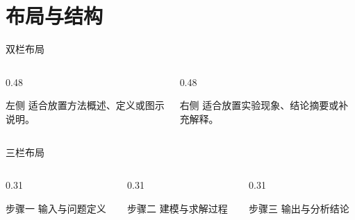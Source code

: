 \section{布局与结构}

\begin{frame}{双栏布局}
  \begin{columns}[T]
    \begin{column}{0.48\textwidth}
      \begin{block}{左侧}
        适合放置方法概述、定义或图示说明。
      \end{block}
    \end{column}
    \begin{column}{0.48\textwidth}
      \begin{block}{右侧}
        适合放置实验现象、结论摘要或补充解释。
      \end{block}
    \end{column}
  \end{columns}
\end{frame}

\begin{frame}{三栏布局}
  \begin{columns}[T]
    \begin{column}{0.31\textwidth}
      \begin{exampleblock}{步骤一}
        输入与问题定义
      \end{exampleblock}
    \end{column}
    \begin{column}{0.31\textwidth}
      \begin{exampleblock}{步骤二}
        建模与求解过程
      \end{exampleblock}
    \end{column}
    \begin{column}{0.31\textwidth}
      \begin{exampleblock}{步骤三}
        输出与分析结论
      \end{exampleblock}
    \end{column}
  \end{columns}
\end{frame}

